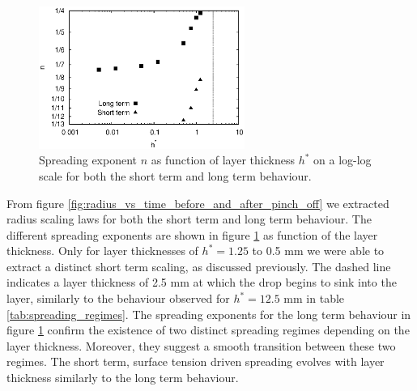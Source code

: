 \documentclass[aip,graphicx]{revtex4-1}
\begin{document}
\begin{figure}[!ht]
\centering
\includegraphics[width=0.6\textwidth]{figures/scaling_vs_layer_inc_short_time.eps}
\caption{Spreading exponent $n$ as function of layer thickness $h^*$
  on a log-log scale for both the short term and long term behaviour.}
\label{fig:scaling_vs_layer}
\end{figure}

From figure \ref{fig:radius_vs_time_before_and_after_pinch_off} we
extracted radius scaling laws for both the short term and long term
behaviour.  The different spreading exponents are shown in figure
\ref{fig:scaling_vs_layer} as function of the layer thickness.  Only
for layer thicknesses of $h^*=1.25$ to 0.5 mm we were able to extract
a distinct short term scaling, as discussed previously.  The dashed
line indicates a layer thickness of 2.5 mm at which the drop begins to
sink into the layer, similarly to the behaviour observed for
$h^*=12.5$ mm in table \ref{tab:spreading_regimes}.  The spreading
exponents for the long term behaviour in figure
\ref{fig:scaling_vs_layer} confirm the existence of two distinct
spreading regimes depending on the layer thickness.  Moreover, they
suggest a smooth transition between these two regimes.  The short
term, surface tension driven spreading evolves with layer thickness
similarly to the long term behaviour. \\
\end{document}
